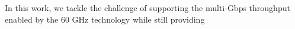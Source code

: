 \begin{comment}
Millimeter-wave (mmWave) wireless is fast emerging as the prime
candidate technology for providing multi-Gbps data rates in future wireless networks.
The IEEE 802.11ad
standard 
provides data rates of up to 6.7 Gbps. 
It
achieves this multi-fold increase over legacy WiFi through
2 GHz-wide channels.
Nonetheless, communication at mmWave frequencies faces fundamental
challenges due to the high propagation and penetration loss. %
The use of directional transmissions 
makes
links susceptible to disruption by human blockage and client
mobility. 
Even if future PHY/MAC improvements may result in faster beam steering, any realistic
indoor scenario is expected to contain enough dynamism
to cause a large number of re-connection events.
\end{comment}
In this work, we tackle the challenge of supporting the multi-Gbps
throughput enabled by the 60 GHz technology while still providing
